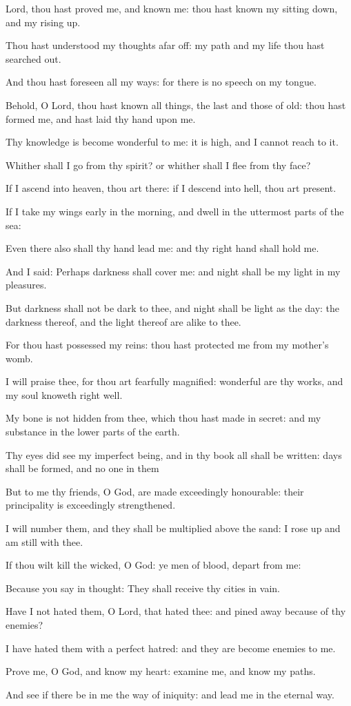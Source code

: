 \item Lord, thou hast proved me, and known me: thou hast known my sitting down, and my rising up.
\item Thou hast understood my thoughts afar off: my path and my life thou hast searched out.
\item And thou hast foreseen all my ways: for there is no speech on my tongue.
\item Behold, O Lord, thou hast known all things, the last and those of old: thou hast formed me, and hast laid thy hand upon me.
\item Thy knowledge is become wonderful to me: it is high, and I cannot reach to it.
\item Whither shall I go from thy spirit? or whither shall I flee from thy face?
\item If I ascend into heaven, thou art there: if I descend into hell, thou art present.
\item If I take my wings early in the morning, and dwell in the uttermost parts of the sea:
\item Even there also shall thy hand lead me: and thy right hand shall hold me.
\item And I said: Perhaps darkness shall cover me: and night shall be my light in my pleasures.
\item But darkness shall not be dark to thee, and night shall be light as the day: the darkness thereof, and the light thereof are alike to thee.
\item For thou hast possessed my reins: thou hast protected me from my mother’s womb.
\item I will praise thee, for thou art fearfully magnified: wonderful are thy works, and my soul knoweth right well.
\item My bone is not hidden from thee, which thou hast made in secret: and my substance in the lower parts of the earth.
\item Thy eyes did see my imperfect being, and in thy book all shall be written: days shall be formed, and no one in them
\item But to me thy friends, O God, are made exceedingly honourable: their principality is exceedingly strengthened.
\item I will number them, and they shall be multiplied above the sand: I rose up and am still with thee.
\item If thou wilt kill the wicked, O God: ye men of blood, depart from me:
\item Because you say in thought: They shall receive thy cities in vain.
\item Have I not hated them, O Lord, that hated thee: and pined away because of thy enemies?
\item I have hated them with a perfect hatred: and they are become enemies to me.
\item Prove me, O God, and know my heart: examine me, and know my paths.
\item And see if there be in me the way of iniquity: and lead me in the eternal way.